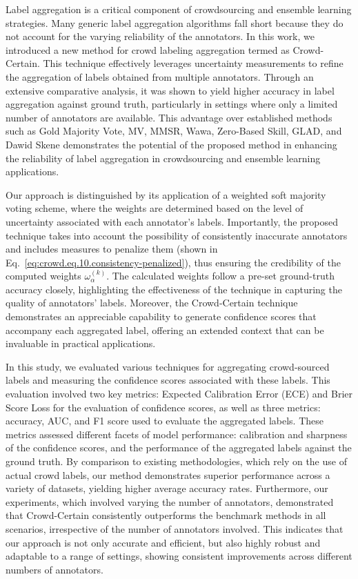 Label aggregation is a critical component of crowdsourcing and ensemble learning strategies. Many generic label aggregation algorithms fall short because they do not account for the varying reliability of the annotators. In this work, we introduced a new method for crowd labeling aggregation termed as Crowd-Certain. This technique effectively leverages uncertainty measurements to refine the aggregation of labels obtained from multiple annotators. Through an extensive comparative analysis, it was shown to yield higher accuracy in label aggregation against ground truth, particularly in settings where only a limited number of annotators are available. This advantage over established methods such as Gold Majority Vote, MV, MMSR, Wawa, Zero-Based Skill, GLAD, and Dawid Skene demonstrates the potential of the proposed method in enhancing the reliability of label aggregation in crowdsourcing and ensemble learning applications.

Our approach is distinguished by its application of a weighted soft majority voting scheme, where the weights are determined based on the level of uncertainty associated with each annotator's labels. Importantly, the proposed technique takes into account the possibility of consistently inaccurate annotators and includes measures to penalize them (shown in Eq.~\ref{eq:crowd.eq.10.consistency-penalized}), thus ensuring the credibility of the computed weights $\omega_{\alpha}^{(k)}$. The calculated weights follow a pre-set ground-truth accuracy closely, highlighting the effectiveness of the technique in capturing the quality of annotators' labels. Moreover, the Crowd-Certain technique demonstrates an appreciable capability to generate confidence scores that accompany each aggregated label, offering an extended context that can be invaluable in practical applications.

In this study, we evaluated various techniques for aggregating crowd-sourced labels and measuring the confidence scores associated with these labels. This evaluation involved two key metrics: Expected Calibration Error (ECE) and Brier Score Loss for the evaluation of confidence scores, as well as three metrics: accuracy, AUC, and F1 score used to evaluate the aggregated labels. These metrics assessed different facets of model performance: calibration and sharpness of the confidence scores, and the performance of the aggregated labels against the ground truth. By comparison to existing methodologies, which rely on the use of actual crowd labels, our method demonstrates superior performance across a variety of datasets, yielding higher average accuracy rates. Furthermore, our experiments, which involved varying the number of annotators, demonstrated that Crowd-Certain consistently outperforms the benchmark methods in all scenarios, irrespective of the number of annotators involved. This indicates that our approach is not only accurate and efficient, but also highly robust and adaptable to a range of settings, showing consistent improvements across different numbers of annotators.

